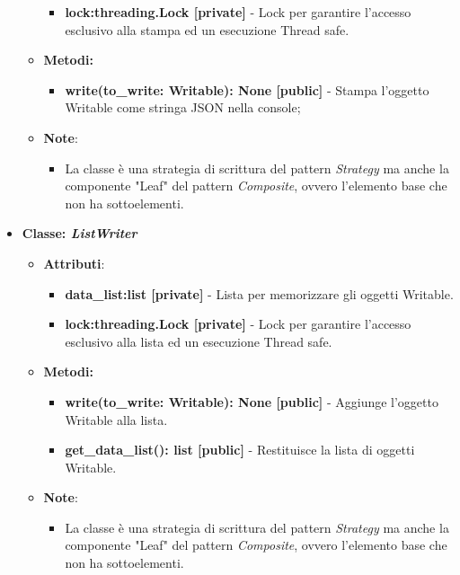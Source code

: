 \begin{itemize}
\begin{itemize}
\begin{itemize}
        \item \textbf{lock:threading.Lock [private]} - Lock per garantire l'accesso esclusivo alla stampa ed un esecuzione Thread safe.
    \end{itemize}
    \item \textbf{Metodi: }
    \begin{itemize}
        \item \textbf{write(to\_write: Writable): None [public]} - Stampa l'oggetto Writable come stringa JSON nella console;
    \end{itemize}
    \item\textbf{Note}:
        \begin{itemize}
            \item La classe è una strategia di scrittura del pattern \textit{Strategy} ma anche la componente "Leaf" del pattern \textit{Composite}, ovvero l'elemento base che non ha sottoelementi.
        \end{itemize}
    \end{itemize}
    \item{\textbf{Classe: \textit{ListWriter}}}
    \begin{itemize}
    \item\textbf{Attributi}:
        \begin{itemize}
        \item \textbf{data\_list:list [private]} - Lista per memorizzare gli oggetti Writable.
        \item \textbf{lock:threading.Lock [private]} - Lock per garantire l'accesso esclusivo alla lista ed un esecuzione Thread safe.
    \end{itemize}
    \item \textbf{Metodi: }
    \begin{itemize}
        \item \textbf{write(to\_write: Writable): None [public]} - Aggiunge l'oggetto Writable alla lista.
        \item \textbf{get\_data\_list(): list [public]} - Restituisce la lista di oggetti Writable.
    \end{itemize}
    \item\textbf{Note}:
        \begin{itemize}
            \item La classe è una strategia di scrittura del pattern \textit{Strategy} ma anche la componente "Leaf" del pattern \textit{Composite}, ovvero l'elemento base che non ha sottoelementi.
        \end{itemize}

\end{itemize}
\end{itemize}
